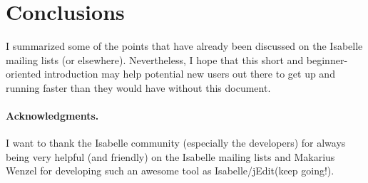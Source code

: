 \documentclass{easychair}
\newcommand\isa{Isa\-belle\xspace}
\newcommand\jedit{jEdit\xspace}
\newcommand\isajedit{\isa/\hspace{0pt}\jedit}
\begin{document}
\section{\label{sec:concl}Conclusions}

I summarized some of the points that have already been discussed
on the \isa mailing lists (or elsewhere). Nevertheless, I hope that this
short and beginner-oriented introduction may help potential new users out there
to get up and running faster than they would have without this document.



\paragraph{Acknowledgments.}
I want to thank the \isa community (especially the developers) for always
being very helpful (and friendly) on the \isa mailing lists and Makarius
Wenzel for developing such an awesome tool as \isajedit (keep going!).



\end{document}
